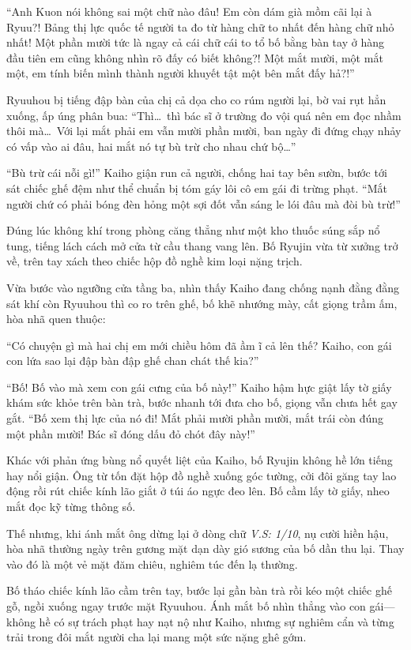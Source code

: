 \documentclass[../main.tex]{subfiles}
\begin{document}
``Anh Kuon nói không sai một chữ nào đâu! Em còn dám già mồm cãi lại à Ryuu?! Bảng thị lực quốc tế người ta đo từ hàng chữ to nhất đến hàng chữ nhỏ nhất! Một phần mười tức là ngay cả cái chữ cái to tổ bố bằng bàn tay ở hàng đầu tiên em cũng không nhìn rõ đấy có biết không?! Một mắt mười, một mắt một, em tính biến mình thành người khuyết tật một bên mắt đấy hả?!''

Ryuuhou bị tiếng đập bàn của chị cả dọa cho co rúm người lại, bờ vai rụt hẳn xuống, ấp úng phân bua: ``Thì\dots\ thì bác sĩ ở trường đo vội quá nên em đọc nhầm thôi mà\dots\ Với lại mắt phải em vẫn mười phần mười, ban ngày đi đứng chạy nhảy có vấp vào ai đâu, hai mắt nó tự bù trừ cho nhau chứ bộ\dots''

``Bù trừ cái nỗi gì!'' Kaiho giận run cả người, chống hai tay bên sườn, bước tới sát chiếc ghế đệm như thể chuẩn bị tóm gáy lôi cô em gái đi trừng phạt. ``Mắt người chứ có phải bóng đèn hỏng một sợi đốt vẫn sáng le lói đâu mà đòi bù trừ!''

Đúng lúc không khí trong phòng căng thẳng như một kho thuốc súng sắp nổ tung, tiếng lách cách mở cửa từ cầu thang vang lên. Bố Ryujin vừa từ xưởng trở về, trên tay xách theo chiếc hộp đồ nghề kim loại nặng trịch.

Vừa bước vào ngưỡng cửa tầng ba, nhìn thấy Kaiho đang chống nạnh đằng đằng sát khí còn Ryuuhou thì co ro trên ghế, bố khẽ nhướng mày, cất giọng trầm ấm, hòa nhã quen thuộc:

``Có chuyện gì mà hai chị em mới chiều hôm đã ầm ĩ cả lên thế? Kaiho, con gái con lứa sao lại đập bàn đập ghế chan chát thế kia?''

``Bố! Bố vào mà xem con gái cưng của bố này!'' Kaiho hậm hực giật lấy tờ giấy khám sức khỏe trên bàn trà, bước nhanh tới đưa cho bố, giọng vẫn chưa hết gay gắt. ``Bố xem thị lực của nó đi! Mắt phải mười phần mười, mắt trái còn đúng một phần mười! Bác sĩ đóng dấu đỏ chót đây này!''

Khác với phản ứng bùng nổ quyết liệt của Kaiho, bố Ryujin không hề lớn tiếng hay nổi giận. Ông từ tốn đặt hộp đồ nghề xuống góc tường, cởi đôi găng tay lao động rồi rút chiếc kính lão giắt ở túi áo ngực đeo lên. Bố cầm lấy tờ giấy, nheo mắt đọc kỹ từng thông số.

Thế nhưng, khi ánh mắt ông dừng lại ở dòng chữ \textit{V.S: 1/10}, nụ cười hiền hậu, hòa nhã thường ngày trên gương mặt dạn dày gió sương của bố dần thu lại. Thay vào đó là một vẻ mặt đăm chiêu, nghiêm túc đến lạ thường.

Bố tháo chiếc kính lão cầm trên tay, bước lại gần bàn trà rồi kéo một chiếc ghế gỗ, ngồi xuống ngay trước mặt Ryuuhou. Ánh mắt bố nhìn thẳng vào con gái—không hề có sự trách phạt hay nạt nộ như Kaiho, nhưng sự nghiêm cẩn và từng trải trong đôi mắt người cha lại mang một sức nặng ghê gớm.
\end{document}
